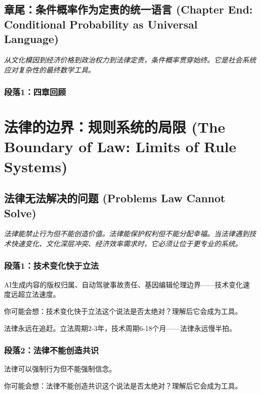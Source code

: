 \documentclass[a4paper,12pt]{book}
\newenvironment{motivation}{\begin{tcolorbox}[colback=gray!10,colframe=gray!60,title=\textit{动机}]\small\itshape}{\end{tcolorbox}}
\begin{document}
\begin{motivation}
\begin{motivation}
\begin{motivation}
\begin{motivation}
\begin{motivation}
	\subsection{章尾：条件概率作为定责的统一语言 (Chapter End: Conditional Probability as Universal Language)}
	\begin{motivation}从文化模因到经济价格到政治权力到法律定责，条件概率贯穿始终。它是社会系统应对复杂性的最终数学工具。
	\end{motivation}
	\subsubsection*{段落1：四章回顾}

	\section{法律的边界：规则系统的局限 (The Boundary of Law: Limits of Rule Systems)}

	\subsection{法律无法解决的问题 (Problems Law Cannot Solve)}
	\begin{motivation}
		法律能禁止行为但不能创造价值。法律能保护权利但不能分配幸福。当法律遇到技术快速变化、文化深层冲突、经济效率需求时，它必须让位于更专业的系统。
	\end{motivation}

	\subsubsection*{段落1：技术变化快于立法}
	AI生成内容的版权归属、自动驾驶事故责任、基因编辑伦理边界——技术变化速度远超立法速度。
	\begin{tcolorbox}[colback=yellow!5, title=\textit{读者行为预测}]
		你可能会想：技术变化快于立法这个说法是否太绝对？理解后它会成为工具。
	\end{tcolorbox}

法律永远在追赶。立法周期2-3年，技术周期6-18个月——法律永远慢半拍。

	\subsubsection*{段落2：法律不能创造共识}
	法律可以强制行为但不能强制信念。
	\begin{tcolorbox}[colback=yellow!5, title=\textit{读者行为预测}]
		你可能会想：法律不能创造共识这个说法是否太绝对？理解后它会成为工具。
	\end{tcolorbox}


\end{motivation}
\end{motivation}
\end{motivation}
\end{motivation}
\end{motivation}
\end{document}
